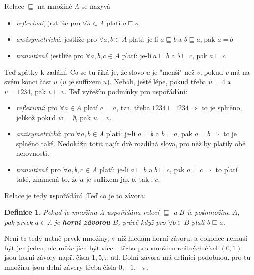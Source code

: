 \documentclass{article}
\newtheorem{definice}{Definice}[section]
\begin{document}
Relace $\sqsubseteq$ na množině $A$ se nazývá 
\begin{itemize}
 \item \emph{reflexivní}, jestliže pro $\forall a \in A$ platí $a \sqsubseteq a$
 \item \emph{antisymetrická}, jestliže pro $\forall a,b \in A$ platí: je-li $a \sqsubseteq b$ a $b \sqsubseteq a$, pak $a = b$
 \item \emph{tranzitivní}, jestliže pro $\forall a,b,c \in A$ platí: je-li $a \sqsubseteq b$ a $b \sqsubseteq c$, pak $a \sqsubseteq c$
\end{itemize} 

Teď zpátky k zadání. Co se tu říká je, že slovo $u$ je "menší" než $v$, pokud $v$ má na svém konci část $u$ ($u$ je suffixem $u$). Neboli, ještě lépe, pokud třeba $u = 4$ a $v = 1234$, pak $u \sqsubseteq v$. Teď vyřeším podmínky pro uspořádání: 

\begin{itemize}
 \item \emph{reflexivní}: pro $\forall a \in A$ platí $a \sqsubseteq a$, tzn. třeba $1234 \sqsubseteq 1234 \Rightarrow$ to je splněno, jelikož pokud $w = \emptyset$, pak $u = v$.
 \item \emph{antisymetrická}: pro $\forall a,b \in A$ platí: je-li $a \sqsubseteq b$ a $b \sqsubseteq a$, pak $a = b \Rightarrow$ to je splněno také. Nedokážu totiž najít dvě rozdílná slova, pro něž by platily obě nerovnosti. 
 \item \emph{tranzitivní}:  pro $\forall a,b,c \in A$ platí: je-li $a \sqsubseteq b$ a $b \sqsubseteq c$, pak $a \sqsubseteq c \Rightarrow$ to platí také, znamená to, že $a$ je suffixem jak $b$, tak i $c$. 
\end{itemize} 

Relace je tedy uspořádání. Teď co je to závora:

\begin{definice}
Pokud je množina $A$ uspořádána relací $\sqsubseteq$ a $B$ je podmnožina $A$, pak prvek $a \in A$ je \textbf{horní závorou} $B$, právě když pro $\forall b \in B$ platí $b \sqsubseteq a$.
\end{definice}

Není to tedy nutně prvek množiny, v níž hledám horní závoru, a dokonce nemusí být jen jeden, ale může jich být více - třeba pro množinu reálných čísel $\left(0,1\right)$ jsou horní závory např. čísla $1,5,\pi$ ad. Dolní závora má definici podobnou, pro tu množinu jsou dolní závory třeba čísla $0,-1,-\pi$.
\end{document}
